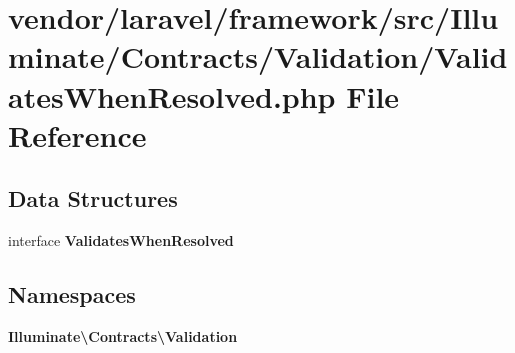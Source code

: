 \section{vendor/laravel/framework/src/\+Illuminate/\+Contracts/\+Validation/\+Validates\+When\+Resolved.php File Reference}
\label{_validates_when_resolved_8php}
\subsection*{Data Structures}
\begin{DoxyCompactItemize}
\item 
interface {\bf Validates\+When\+Resolved}
\end{DoxyCompactItemize}
\subsection*{Namespaces}
\begin{DoxyCompactItemize}
\item 
 {\bf Illuminate\textbackslash{}\+Contracts\textbackslash{}\+Validation}
\end{DoxyCompactItemize}
